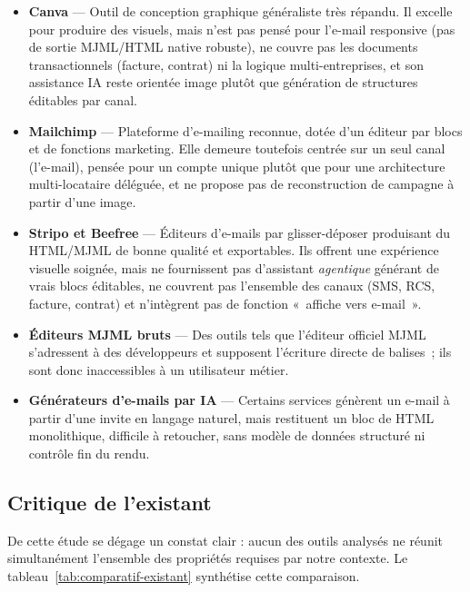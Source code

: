 \begin{itemize}[leftmargin=1.4cm]
  \item \textbf{Canva} — Outil de conception graphique généraliste très
  répandu. Il excelle pour produire des visuels, mais n'est pas pensé pour
  l'e-mail responsive (pas de sortie MJML/HTML native robuste), ne couvre
  pas les documents transactionnels (facture, contrat) ni la logique
  multi-entreprises, et son assistance IA reste orientée image plutôt que
  génération de structures éditables par canal.

  \item \textbf{Mailchimp} — Plateforme d'e-mailing reconnue, dotée d'un
  éditeur par blocs et de fonctions marketing. Elle demeure toutefois
  centrée sur un seul canal (l'e-mail), pensée pour un compte unique plutôt
  que pour une architecture multi-locataire déléguée, et ne propose pas de
  reconstruction de campagne à partir d'une image.

  \item \textbf{Stripo et Beefree} — Éditeurs d'e-mails par glisser-déposer
  produisant du HTML/MJML de bonne qualité et exportables. Ils offrent une
  expérience visuelle soignée, mais ne fournissent pas d'assistant
  \emph{agentique} générant de vrais blocs éditables, ne couvrent pas
  l'ensemble des canaux (SMS, RCS, facture, contrat) et n'intègrent pas de
  fonction «~affiche vers e-mail~».

  \item \textbf{Éditeurs MJML bruts} — Des outils tels que l'éditeur
  officiel MJML s'adressent à des développeurs et supposent l'écriture
  directe de balises~; ils sont donc inaccessibles à un utilisateur métier.

  \item \textbf{Générateurs d'e-mails par IA} — Certains services génèrent
  un e-mail à partir d'une invite en langage naturel, mais restituent un
  bloc de HTML monolithique, difficile à retoucher, sans modèle de données
  structuré ni contrôle fin du rendu.
\end{itemize}

\subsection{Critique de l'existant}
De cette étude se dégage un constat clair : aucun des outils analysés ne
réunit simultanément l'ensemble des propriétés requises par notre contexte.
Le tableau~\ref{tab:comparatif-existant} synthétise cette comparaison.

